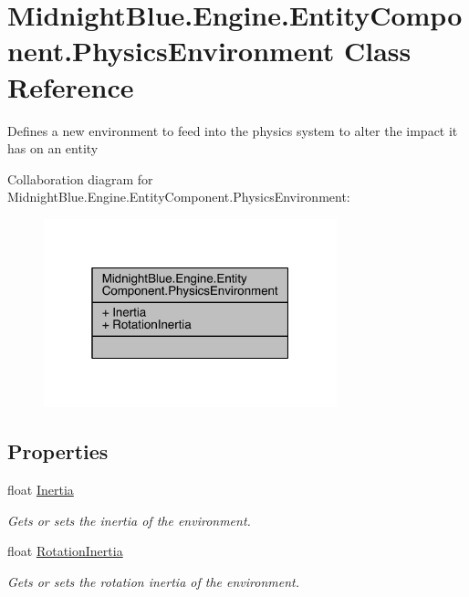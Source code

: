 \hypertarget{class_midnight_blue_1_1_engine_1_1_entity_component_1_1_physics_environment}{}\section{Midnight\+Blue.\+Engine.\+Entity\+Component.\+Physics\+Environment Class Reference}
\label{class_midnight_blue_1_1_engine_1_1_entity_component_1_1_physics_environment}


Defines a new environment to feed into the physics system to alter the impact it has on an entity  




Collaboration diagram for Midnight\+Blue.\+Engine.\+Entity\+Component.\+Physics\+Environment\+:
\nopagebreak
\begin{figure}[H]
\begin{center}
\leavevmode
\includegraphics[width=241pt]{class_midnight_blue_1_1_engine_1_1_entity_component_1_1_physics_environment__coll__graph}
\end{center}
\end{figure}
\subsection*{Properties}
\begin{DoxyCompactItemize}
\item 
float \hyperlink{class_midnight_blue_1_1_engine_1_1_entity_component_1_1_physics_environment_ab10f12cb0c2f4a7117b31ef30fe9aee9}{Inertia}
\begin{DoxyCompactList}\small\item\em Gets or sets the inertia of the environment. \end{DoxyCompactList}\item 
float \hyperlink{class_midnight_blue_1_1_engine_1_1_entity_component_1_1_physics_environment_ae639fde9c7426767082623ffba336e0c}{Rotation\+Inertia}
\begin{DoxyCompactList}\small\item\em Gets or sets the rotation inertia of the environment. \end{DoxyCompactList}\end{DoxyCompactItemize}


